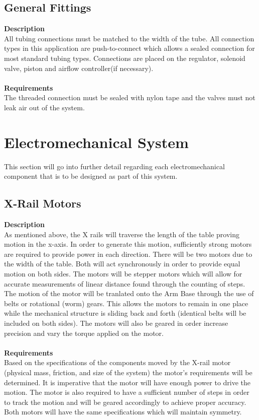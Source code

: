 \documentclass[titlepage]{article}
\begin{document}

\subsection{General Fittings}
\textbf{Description}\\
All tubing connections must be matched to the width of the tube. All connection types in this application are push-to-connect which allows a sealed connection for most standard tubing types. Connections are placed on the regulator, solenoid valve, piston and airflow controller(if necessary).\\~\\
\textbf{Requirements}\\
The threaded connection must be sealed with nylon tape and the valves must not leak air out of the system.







\newpage
\section{Electromechanical System}
This section will go into further detail regarding each electromechanical component that is to be designed as part of this system.
\subsection{X-Rail Motors}
\textbf{Description}\\
As mentioned above, the X rails will traverse the length of the table proving motion in the x-axis. In order to generate this motion, sufficiently strong motors are required to provide power in each direction. There will be two motors due to the width of the table. Both will act synchronously in order to provide equal motion on both sides. The motors will be stepper motors which will allow for accurate measurements of linear distance found through the counting of steps. The motion of the motor will be tranlated onto the Arm Base through the use of belts or rotational (worm) gears. This allows the motors to remain in one place while the mechanical structure is sliding back and forth (identical belts will be included on both sides). The motors will also be geared in order increase precision and vary the torque applied on the motor.\\~\\
\textbf{Requirements}\\
Based on the specifications of the components moved by the X-rail motor (physical mass, friction, and size of the system) the motor's requirements will be determined. It is imperative that the motor will have enough power to drive the motion. The motor is also required to have a sufficient number of steps in order to track the motion and will be geared accordingly to achieve proper accuracy. Both motors will have the same specifications which will maintain symmetry. 
\end{document}
